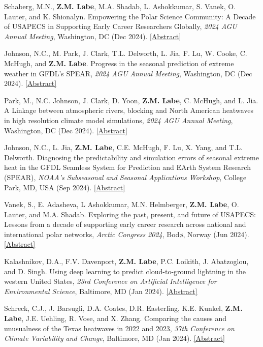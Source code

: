 \documentclass[margin,line,palatino,courier,10pt]{res}
\begin{document}
\begin{resume}
\begin{etaremune}[leftmargin=0in,topsep=0in,parsep=0in]
\item Schaberg, M.N., \textbf{Z.M. Labe}, M.A. Shadab, L. Ashokkumar, S. Vanek, O. Lauter, and K. Shionalyn. Empowering the Polar Science Community: A Decade of USAPECS in Supporting Early Career Researchers Globally, \textit{2024 AGU Annual Meeting}, Washington, DC (Dec 2024). \href{https://agu.confex.com/agu/agu24/meetingapp.cgi/Paper/1696092}{[Abstract]}
\item Johnson, N.C., M. Park, J. Clark, T.L. Delworth, L. Jia, F. Lu, W. Cooke, C. McHugh, and \textbf{Z.M. Labe}. Progress in the seasonal prediction of extreme weather in GFDL’s SPEAR, \textit{2024 AGU Annual Meeting}, Washington, DC (Dec 2024). \href{https://agu.confex.com/agu/agu24/meetingapp.cgi/Paper/1531073}{[Abstract]}
\item Park, M., N.C. Johnson, J. Clark, D. Yoon, \textbf{Z.M. Labe}, C. McHugh, and L. Jia. A Linkage between atmospheric rivers, blocking and North American heatwaves in high resolution climate model simulations, \textit{2024 AGU Annual Meeting}, Washington, DC (Dec 2024). \href{https://agu.confex.com/agu/agu24/meetingapp.cgi/Paper/1543440}{[Abstract]}
\item Johnson, N.C., L. Jia, \textbf{Z.M. Labe}, C.E. McHugh, F. Lu, X. Yang, and T.L. Delworth. Diagnosing the predictability and simulation errors of seasonal extreme heat in the GFDL Seamless System for Prediction and EArth System Research (SPEAR), \textit{NOAA's Subseasonal and Seasonal Applications Workshop}, College Park, MD, USA (Sep 2024). \href{https://vlab.noaa.gov/documents/17693964/39260487/Johnson_Nathaniel_2024-s2s.pdf}{[Abstract]}
\item Vanek, S., E. Adasheva, L Ashokkumar, M.N. Helmberger, \textbf{Z.M. Labe}, O. Lauter, and M.A. Shadab. Exploring the past, present, and future of USAPECS: Lessons from a decade of supporting early career research across national and international polar networks, \textit{Arctic Congress 2024}, Bod\o, Norway (Jun 2024). \href{https://www.eventsforce.net/apriilcongress/frontend/reg/absViewDocumentFE.csp?popup=1&documentID=1310&eventID=57}{[Abstract]}
\item Kalashnikov, D.A., F.V. Davenport, \textbf{Z.M. Labe}, P.C. Loikith, J. Abatzoglou, and D. Singh. Using deep learning to predict cloud-to-ground lightning in the western United States, \textit{23rd Conference on Artificial Intelligence for Environmental Science}, Baltimore, MD (Jan 2024). \href{https://ams.confex.com/ams/104ANNUAL/meetingapp.cgi/Paper/431802}{[Abstract]}
\item Schreck, C.J., J. Barsugli, D.A. Coates, D.R. Easterling, K.E. Kunkel, \textbf{Z.M. Labe}, J.E. Uehling, R. Vose, and X. Zhang. Comparing the causes and unusualness of the Texas heatwaves in 2022 and 2023, \textit{37th Conference on Climate Variability and Change}, Baltimore, MD (Jan 2024). \href{https://ams.confex.com/ams/104ANNUAL/meetingapp.cgi/Paper/427912}{[Abstract]}

\end{etaremune}
\end{resume}
\end{document}
